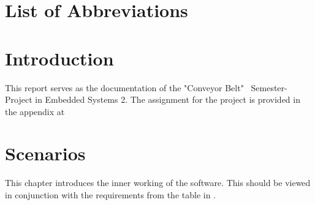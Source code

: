 \documentclass[a4paper,12pt,twoside]{scrreprt}
\begin{document}
\thispagestyle{empty}
\fancyfoot[C]{\thepage}%
\clearpage
{}
{}
\thispagestyle{empty}
\fancyfoot[C]{\thepage}%
\chapter*{List of Abbreviations}
\thispagestyle{empty}
\fancyfoot[C]{\thepage}%
\begin{acronym}[SQL]

\end{acronym}





\chapter{Introduction}
\label{chap:Introduction}
This report serves as the documentation of the "Conveyor Belt" \, Semester-Project in Embedded Systems 2. The assignment for the project is provided in the appendix at 

\chapter{Scenarios}
This chapter introduces the inner working of the software. This should be viewed in conjunction with the requirements from the table in . 
\end{document}
